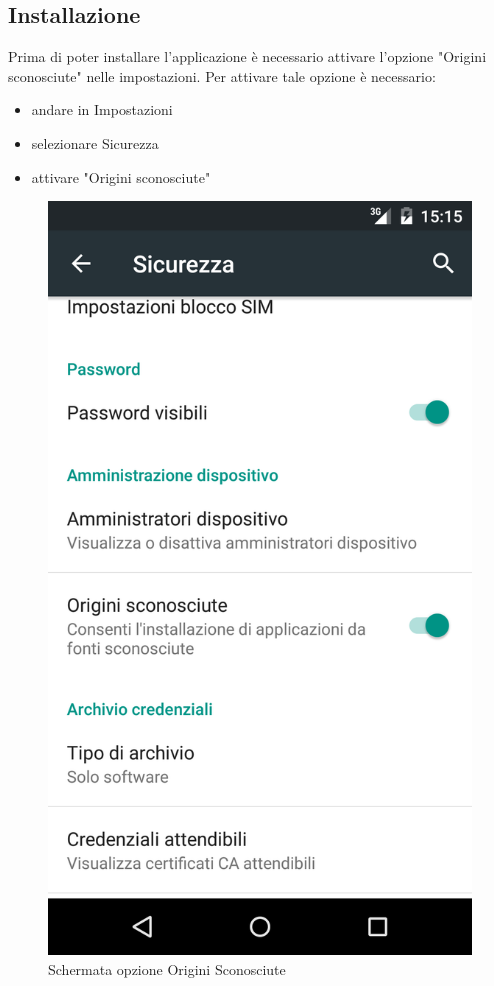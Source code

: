 \subsection{Installazione}

Prima di poter installare l'applicazione è necessario attivare l'opzione "Origini sconosciute" nelle impostazioni.
Per attivare tale opzione è necessario:
\begin{itemize}
	\item andare in Impostazioni
	\item selezionare Sicurezza
	\item attivare "Origini sconosciute"
\end{itemize}

\begin{figure}[!h]
	\centering
	\includegraphics[scale=0.10]{screenshot/origini_sconosciute}
	\caption{Schermata opzione Origini Sconosciute}
\end{figure}

